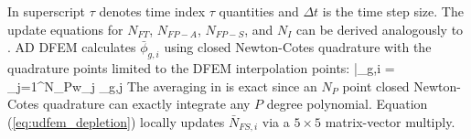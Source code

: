 In  superscript $\tau$ denotes time index $\tau$ quantities and $\Delta t$ is the time step size.
The update equations for $N_{FT}$, $N_{FP-A}$, $N_{FP-S}$, and $N_I$ can be derived analogously to .
AD DFEM calculates $\bar{\phi}_{g,i}$ using closed Newton-Cotes quadrature with the quadrature points limited to the DFEM interpolation points:
\benum
\label{eq:avg}
\bar{\phi}_{g,i} = \sum_{j=1}^{N_P}{w_j \phi_{g,j} } \pep
\eenum
The averaging in  is exact since an $N_P$ point closed Newton-Cotes quadrature can exactly integrate any $P$ degree polynomial.
Equation (\ref{eq:udfem_depletion}) locally updates $\bar{N}_{FS,i}$ via a $5\times5$ matrix-vector multiply.

